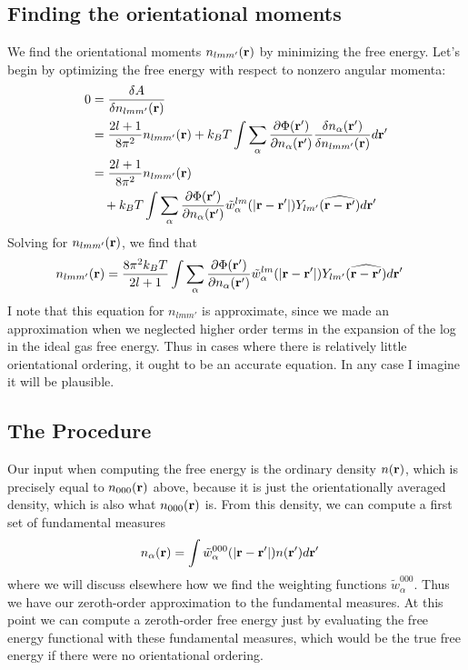 \documentclass[letterpaper,twocolumn,amsmath,amssymb,pre]{revtex4-1}
\begin{document}
\subsection{Finding the orientational moments}
We find the orientational moments $n_{lmm'}(\mathbf{r})$ by minimizing the
free energy.  Let's begin by optimizing the free energy with respect
to nonzero angular momenta:
\begin{align}
  0&=\frac{\delta A}{\delta n_{lmm'}(\mathbf{r})} \\
  &= \frac{2l+1}{8\pi^2}n_{lmm'}(\mathbf{r})
  + k_BT \int\sum_\alpha
  \frac{\partial \Phi(\mathbf{r}')}{\partial n_\alpha(\mathbf{r}')}
  \frac{\delta n_\alpha(\mathbf{r}')}{\delta n_{lmm'}(\mathbf{r})} d\mathbf{r}'
  \\
  &=
   \frac{2l+1}{8\pi^2}n_{lmm'}(\mathbf{r})
  \\&\quad+ k_BT \int\sum_\alpha
  \frac{\partial \Phi(\mathbf{r}')}{\partial n_\alpha(\mathbf{r}')}
  \tilde{w}_\alpha^{lm}(|\mathbf{r}-\mathbf{r}'|)Y_{lm'}(\widehat{\mathbf{r}-\mathbf{r}'}) d\mathbf{r}'
\end{align}
Solving for $n_{lmm'}(\mathbf{r})$, we find that
\begin{align}\label{eq:nlmm'}
  n_{lmm'}(\mathbf{r}) &= \frac{8\pi^2k_BT}{2l+1}
  \int\sum_\alpha
  \frac{\partial \Phi(\mathbf{r}')}{\partial n_\alpha(\mathbf{r}')}
  \tilde{w}_\alpha^{lm}(|\mathbf{r}-\mathbf{r}'|)Y_{lm'}(\widehat{\mathbf{r}-\mathbf{r}'}) d\mathbf{r}'
\end{align}
I note that this equation for $n_{lmm'}$ is approximate, since we made
an approximation when we neglected higher order terms in the expansion
of the log in the ideal gas free energy.  Thus in cases where there is
relatively little orientational ordering, it ought to be an accurate
equation.  In any case I imagine it will be plausible.

\subsection{The Procedure}
Our input when computing the free energy is the ordinary density
$n(\mathbf{r})$, which is precisely equal to $n_{000}(\mathbf{r})$ above, because it
is just the orientationally averaged density, which is also what
$n_{000}(\mathbf{r})$ is.  From this density, we can compute a first set of
fundamental measures
\begin{align}
  n_\alpha(\mathbf{r}) &= \int \tilde{w}_\alpha^{000}(|\mathbf{r}-\mathbf{r}'|)n(\mathbf{r}')d\mathbf{r}'
\end{align}
where we will discuss elsewhere how we find the weighting functions
$\tilde{w}_\alpha^{000}$.  Thus we have our zeroth-order approximation
to the fundamental measures.  At this point we can compute a
zeroth-order free energy just by evaluating the free energy functional
with these fundamental measures, which would be the true free energy
if there were no orientational ordering.
\end{document}
